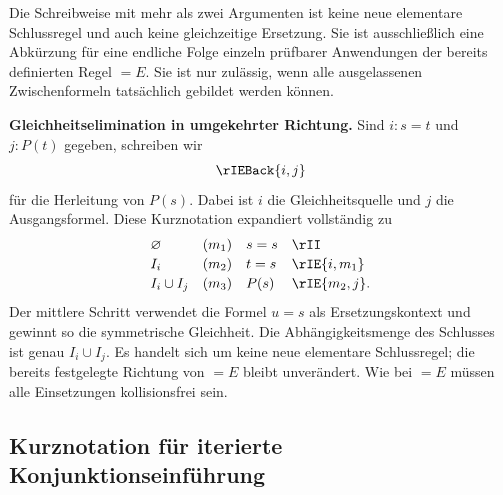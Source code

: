 \documentclass[main.tex]{subfiles}
\begin{document}
\begin{remark}
Die Schreibweise mit mehr als zwei Argumenten ist keine neue
elementare Schlussregel und auch keine gleichzeitige Ersetzung. Sie
ist ausschließlich eine Abkürzung für eine endliche Folge einzeln
prüfbarer Anwendungen der bereits definierten Regel \(=E\). Sie ist
nur zulässig, wenn alle ausgelassenen Zwischenformeln tatsächlich
gebildet werden können.

\medskip\noindent\textbf{Gleichheitselimination in umgekehrter Richtung.}
\begingroup
\hypertarget{rule.IEBack}{}%
\makeatletter
\def\@currentHref{rule.IEBack}%
\def\@currentlabelname{Gleichheitselimination in umgekehrter Richtung}%
\label{rule:IEBack}%
\makeatother
Sind \(i\colon s=t\) und \(j\colon P(t)\) gegeben, schreiben wir
\[
  \rIEBack{i,j}
\]
für die Herleitung von \(P(s)\). Dabei ist \(i\) die Gleichheitsquelle
und \(j\) die Ausgangsformel. Diese Kurznotation expandiert vollständig
zu
\[
  \begin{array}{llll}
    \varnothing & (m_1) & s=s & \rII \\[2pt]
    I_i & (m_2) & t=s & \rIE{i,m_1} \\[2pt]
    I_i\cup I_j & (m_3) & P(s) & \rIE{m_2,j}.
  \end{array}
\]
Der mittlere Schritt verwendet die Formel \(u=s\) als
Ersetzungskontext und gewinnt so die symmetrische Gleichheit.
Die Abhängigkeitsmenge des Schlusses ist genau \(I_i\cup I_j\).
Es handelt sich um keine neue elementare Schlussregel; die bereits
festgelegte Richtung von \(=E\) bleibt unverändert. Wie bei \(=E\)
müssen alle Einsetzungen kollisionsfrei sein.
\endgroup
\end{remark}

\subsection{Kurznotation für iterierte Konjunktionseinführung}
\end{document}
